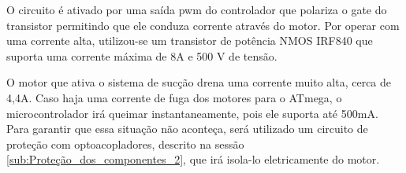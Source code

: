 		O circuito é ativado por uma saída pwm do controlador que polariza o gate do transistor permitindo que ele conduza corrente através do motor. Por operar com uma corrente alta, utilizou-se um transistor de potência NMOS IRF840 que suporta uma corrente máxima de 8A e 500 V de tensão.

		O motor que ativa o sistema de sucção drena uma corrente muito alta, cerca de 4,4A. Caso haja uma corrente de fuga dos motores para o ATmega, o microcontrolador irá queimar instantaneamente, pois ele suporta até 500mA. Para garantir que essa situação não aconteça, será utilizado um circuito de proteção com optoacopladores, descrito na sessão \ref{sub:Proteção_dos_componentes_2}, que irá isola-lo eletricamente do motor.

